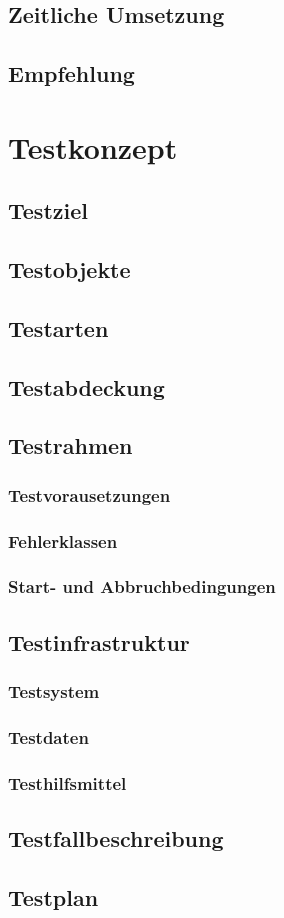 \subsection{Zeitliche Umsetzung}
\subsection{Empfehlung}
\section{Testkonzept}
\subsection{Testziel}
\subsection{Testobjekte}
\subsection{Testarten}
\subsection{Testabdeckung}
\subsection{Testrahmen}
\subsubsection{Testvorausetzungen}
\subsubsection{Fehlerklassen}
\subsubsection{Start- und Abbruchbedingungen}
\subsection{Testinfrastruktur}
\subsubsection{Testsystem}
\subsubsection{Testdaten}
\subsubsection{Testhilfsmittel}
\subsection{Testfallbeschreibung}
\subsection{Testplan}
